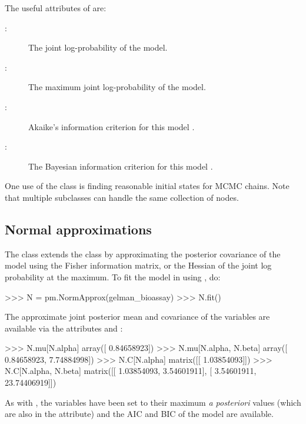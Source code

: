 \documentclass[]{jss}
\begin{document}
The useful attributes of  are:
\begin{description}
    \item[:] The joint log-probability of the model.
    \item[:] The maximum joint log-probability of the model.
    \item[:] Akaike's information criterion for this model \citep{Akaike:1973aj,Burnham:2002ic}.
    \item[:] The Bayesian information criterion for this model \citep{Schwarz:1978ud}.
\end{description}

One use of the  class is finding reasonable initial states for MCMC chains. Note that multiple  subclasses can handle the same collection of nodes.

\subsection{Normal approximations} \label{sec:norm-approx}

The  class extends the  class by approximating the posterior covariance of the model using the Fisher information matrix, or the Hessian of the joint log probability at the maximum. To fit the model in  using , do:
\begin{CodeInput}
>>> N = pm.NormApprox(gelman_bioassay)
>>> N.fit()
\end{CodeInput}
The approximate joint posterior mean and covariance of the variables are available via the attributes  and :
\begin{CodeInput}
>>> N.mu[N.alpha]
array([ 0.84658923])
>>> N.mu[N.alpha, N.beta]
array([ 0.84658923,  7.74884998])
>>> N.C[N.alpha]
matrix([[ 1.03854093]])
>>> N.C[N.alpha, N.beta]
matrix([[  1.03854093,   3.54601911],
    [  3.54601911,  23.74406919]])
\end{CodeInput}
As with , the variables have been set to their maximum \emph{a posteriori} values (which are also in the  attribute) and the AIC and BIC of the model are available.
\end{document}
